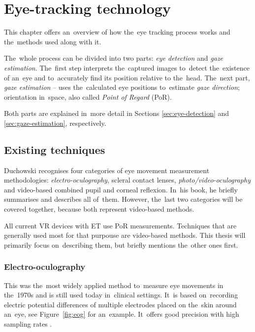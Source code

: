 \chapter{Eye-tracking technology}
\begin{chapterabstract}
This chapter offers an~overview of how the~eye tracking process works and the~methods used along with it.
\end{chapterabstract}

The~whole process can be divided into two parts: \emph{eye detection} and \emph{gaze estimation}. The~first step interprets the~captured images to~detect the~existence of an~eye and to~accurately find its position relative to the~head. The~next part, \emph{gaze estimation} -- uses the~calculated eye positions to~estimate \emph{gaze direction}; orientation in~space, also called \emph{Point of Regard} (PoR). \cite{hansen2010}

\medskip{}
Both parts are explained in~more detail in Sections \ref{sec:eye-detection} and \ref{sec:gaze-estimation}, respectively. 

\section{Existing techniques}
Duchowski recognises four categories of eye movement measurement methodologies: \emph{electro-oculography}, scleral contact lenses, \emph{photo/video-oculography} %
and video-based combined pupil and corneal reflexion. In~his book, he briefly summarises and describes all of~them. However, the~last two categories will be covered together, because both represent video-based methods.~\cite{duchowski2007}

All current VR devices with ET use PoR measurements. %
Techniques that are generally used most for that purpouse are video-based methods. This thesis will primarily focus on~describing them, but briefly mentions the~other ones first. 


\subsection{Electro-oculography}
This was the~most widely applied method to~measure eye movements in the~1970s and is still used today in~clinical settings. It~is based on~recording electric potential differences of multiple electrodes placed on the~skin around an~eye, see Figure~\ref{fig:eog} for an~example. It~offers good precision with high sampling rates \cite{cognolato2018}.

